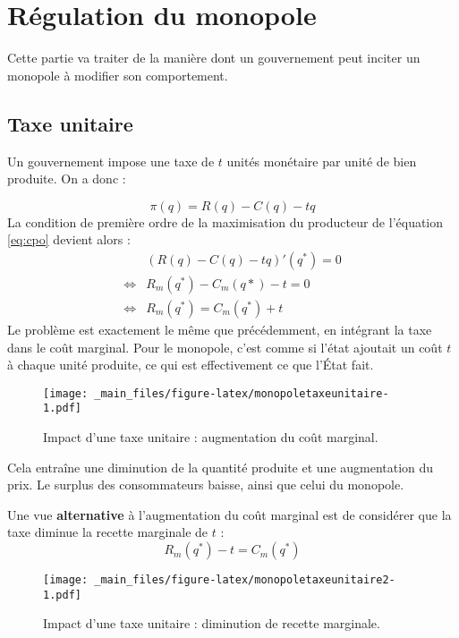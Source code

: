 \documentclass[
]{book}
\theoremstyle{definition}
\theoremstyle{definition}
\theoremstyle{definition}
\theoremstyle{definition}
\theoremstyle{remark}
\begin{document}
\hypertarget{ruxe9gulation-du-monopole}{%
\section{Régulation du monopole}\label{ruxe9gulation-du-monopole}}

Cette partie va traiter de la manière dont un gouvernement peut inciter un monopole à modifier son comportement.

\hypertarget{taxe-unitaire}{%
\subsection{Taxe unitaire}\label{taxe-unitaire}}

Un gouvernement impose une taxe de \(t\) unités monétaire par unité de bien produite.
On a donc :

\[
\pi(q) = R(q) - C(q) -tq
\]
La condition de première ordre de la maximisation du producteur de l'équation \eqref{eq:cpo} devient alors :
\[
\begin{array}{rl}
&(R(q)-C(q) -tq)'(q^*) = 0\\
\Leftrightarrow & R_m(q^*)-C_m(q*) -t = 0\\
\Leftrightarrow & R_m(q^*) = C_m(q^*) + t
\end{array}
\]
Le problème est exactement le même que précédemment, en intégrant la taxe dans le coût marginal.
Pour le monopole, c'est comme si l'état ajoutait un coût \(t\) à chaque unité produite, ce qui est effectivement ce que l'État fait.

\begin{figure}
\centering
\texttt{[image: \_main\_files/figure-latex/monopoletaxeunitaire-1.pdf]}
\caption{\label{fig:monopoletaxeunitaire}Impact d'une taxe unitaire : augmentation du coût marginal.}
\end{figure}

Cela entraîne une diminution de la quantité produite et une augmentation du prix.
Le surplus des consommateurs baisse, ainsi que celui du monopole.

Une vue \textbf{alternative} à l'augmentation du coût marginal est de considérer que la taxe diminue la recette marginale de \(t\) :
\[
 R_m(q^*) -t = C_m(q^*)
\]

\begin{figure}
\centering
\texttt{[image: \_main\_files/figure-latex/monopoletaxeunitaire2-1.pdf]}
\caption{\label{fig:monopoletaxeunitaire2}Impact d'une taxe unitaire : diminution de recette marginale.}
\end{figure}
\end{document}
